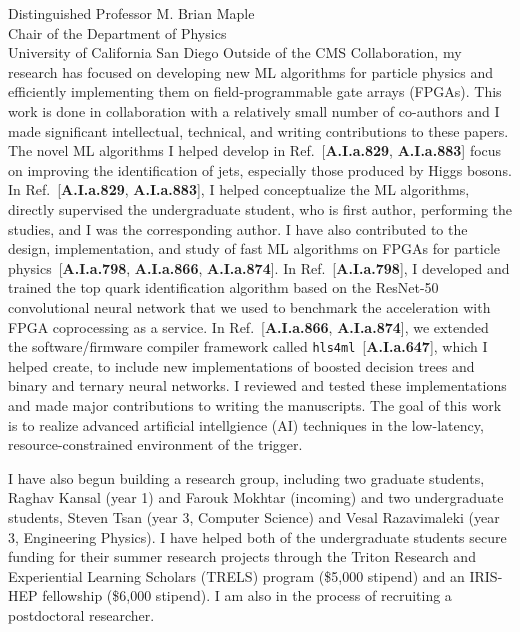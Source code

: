 \documentclass[ucsd,cs,11pt]{ucletter}
\begin{document}
\begin{letter}{
  Distinguished Professor M. Brian Maple\\
  Chair of the Department of Physics\\
  University of California San Diego
}
Outside of the CMS Collaboration, my research has focused on developing new ML algorithms for particle physics and efficiently implementing them on field-programmable gate arrays (FPGAs).
This work is done in collaboration with a relatively small number of co-authors and I made significant intellectual, technical, and writing contributions to these papers.
The novel ML algorithms I helped develop in Ref.~[\textbf{A.I.a.829}, \textbf{A.I.a.883}] focus on improving the identification of jets, especially those produced by Higgs bosons.
In Ref.~[\textbf{A.I.a.829}, \textbf{A.I.a.883}], I helped conceptualize the ML algorithms, directly supervised the undergraduate student, who is first author, performing the studies, and I was the corresponding author.
I have also contributed to the design, implementation, and study of fast ML algorithms on FPGAs for particle physics~[\textbf{A.I.a.798}, \textbf{A.I.a.866}, \textbf{A.I.a.874}].
In Ref.~[\textbf{A.I.a.798}], I developed and trained the top quark identification algorithm based on the ResNet-50 convolutional neural network that we used to benchmark the acceleration with FPGA coprocessing as a service.
In Ref.~[\textbf{A.I.a.866}, \textbf{A.I.a.874}], we extended the software/firmware compiler framework called \texttt{hls4ml}~[\textbf{A.I.a.647}], which I helped create, to include new implementations of boosted decision trees and binary and ternary neural networks.
I reviewed and tested these implementations and made major contributions to writing the manuscripts.
The goal of this work is to realize advanced artificial intellgience (AI) techniques in the low-latency, resource-constrained environment of the trigger.

I have also begun building a research group, including two graduate students, Raghav Kansal (year 1) and Farouk Mokhtar (incoming) and two undergraduate students, Steven Tsan (year 3, Computer Science) and Vesal Razavimaleki (year 3, Engineering Physics).
I have helped both of the undergraduate students secure funding for their summer research projects through the Triton Research and Experiential Learning Scholars (TRELS) program (\$5,000 stipend) and an IRIS-HEP fellowship (\$6,000 stipend).
I am also in the process of recruiting a postdoctoral researcher.


\end{letter}
\end{document}
